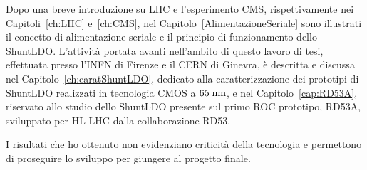 Dopo una breve introduzione su LHC e l'esperimento CMS, rispettivamente nei Capitoli~\ref{ch:LHC} e~\ref{ch:CMS}, nel Capitolo~\ref{AlimentazioneSeriale} sono illustrati il concetto di alimentazione seriale e il principio di funzionamento dello ShuntLDO. L'attivit\`a portata avanti nell'ambito di questo lavoro di tesi, effettuata presso l'INFN di Firenze e il CERN di Ginevra, \`e descritta e discussa nel  Capitolo~\ref{ch:caratShuntLDO}, dedicato alla caratterizzazione dei prototipi di ShuntLDO realizzati in tecnologia CMOS a $65\rm \; nm$, e nel Capitolo~\ref{cap:RD53A}, riservato allo studio dello ShuntLDO presente sul primo ROC prototipo, RD53A, sviluppato per HL-LHC dalla collaborazione RD53.

I risultati che ho ottenuto non evidenziano criticit\`a della tecnologia e permettono di proseguire lo sviluppo per giungere al progetto finale.




